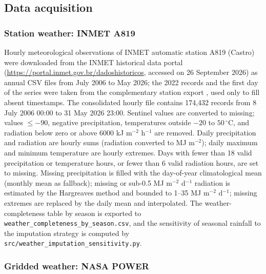 \documentclass[times,final,authoryear]{elsarticle}
\begin{document}
\subsection{Data acquisition}
\label{subdata}

\subsubsection{Station weather: INMET A819}
\label{subweather}

Hourly meteorological observations of INMET automatic station A819 (Castro) were downloaded from the INMET historical data portal (\url{https://portal.inmet.gov.br/dadoshistoricos}, accessed on 26 September 2026) as annual CSV files from July 2006 to May 2026; the 2022 records and the first day of the series were taken from the complementary station export , used only to fill absent timestamps. The consolidated hourly file contains 174,432 records from 8 July 2006 00:00 to 31 May 2026 23:00. Sentinel values are converted to missing; values $\leq -90$, negative precipitation, temperatures outside $-20$ to $50\,^{\circ}$C, and radiation below zero or above 6000 kJ m$^{-2}$ h$^{-1}$ are removed. Daily precipitation and radiation are hourly sums (radiation converted to MJ m$^{-2}$); daily maximum and minimum temperature are hourly extremes. Days with fewer than 18 valid precipitation or temperature hours, or fewer than 6 valid radiation hours, are set to missing. Missing precipitation is filled with the day-of-year climatological mean (monthly mean as fallback); missing or sub-0.5 MJ m$^{-2}$ d$^{-1}$ radiation is estimated by the Hargreaves method and bounded to 1--35 MJ m$^{-2}$ d$^{-1}$; missing extremes are replaced by the daily mean and interpolated. The weather-completeness table by season is exported to \texttt{weather\_completeness\_by\_season.csv}, and the sensitivity of seasonal rainfall to the imputation strategy is computed by \texttt{src/weather\_imputation\_sensitivity.py}.

\subsubsection{Gridded weather: NASA POWER}
\label{subpower}
\end{document}
